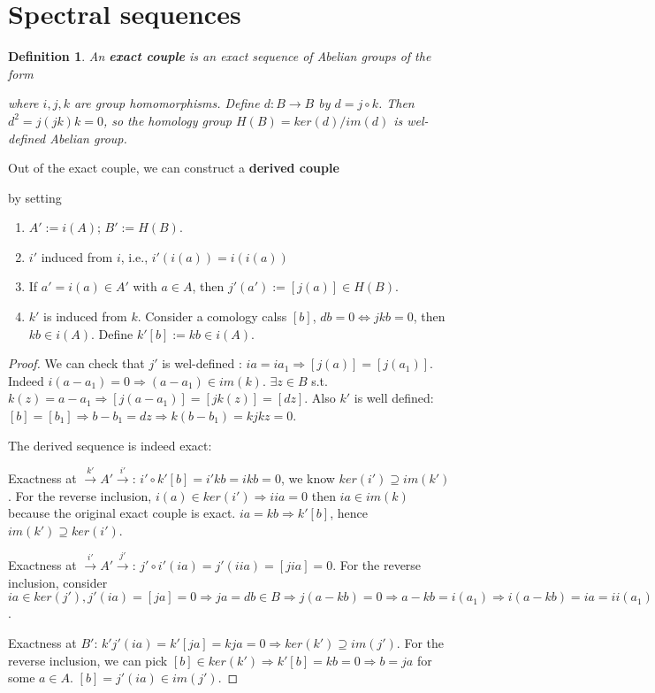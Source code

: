 \documentclass[11pt]{article}
\newtheorem{dfn}[thm]{Definition}
\newcommand{\Lrta}{\Longrightarrow}
\newcommand{\lrta}{\longrightarrow}
\newcommand{\Llrta}{\Longleftrightarrow}
\begin{document}
\section{Spectral sequences}
\begin{dfn}
An \textbf{exact couple} is an exact sequence of Abelian groups of the form
\begin{center}
\end{center}
where $i,j,k$ are group homomorphisms. Define $d:B\lrta B$ by $d=j\circ k$. Then $d^2=j(jk)k=0$, so the homology group $H(B)=ker(d)/im(d)$ is wel-defined Abelian group. 
\end{dfn}
Out of the exact couple, we can construct a \textbf{derived couple}
\begin{center}
\end{center}
by setting
\begin{enumerate}[label=(\roman*)]
\item $A':=i(A)$; $B':=H(B)$.
\item $i'$ induced from $i$, i.e., $i'(i(a))=i(i(a))$
\item If $a'=i(a)\in A'$ with $a\in A$, then $j'(a'):=[j(a)]\in H(B)$.
\item $k'$ is induced from $k$. Consider a comology calss $[b]$, $d b=0\Llrta jkb=0$, then $kb\in i(A)$. Define $k'[b]:=kb\in i(A)$.
\end{enumerate}
\begin{proof}
We can check that $j'$ is wel-defined : $ia=i a_1\Lrta [j(a)]=[j(a_1)]$. Indeed $i(a-a_1)=0\Lrta (a-a_1)\in im(k)$. $\exists z\in B$ s.t. $k(z)=a-a_1\Lrta [j(a-a_1)]=[jk(z)]=[dz]$. Also $k'$ is well defined: $[b]=[b_1]\Lrta b-b_1=d z\Lrta k(b-b_1)=k j kz=0$.

The derived sequence is indeed exact:

{Exactness at $\overset{k'}{\lrta}A'\overset{i'}{\lrta}$}: $i'\circ k'[b]=i'kb=ikb=0$, we know $ker(i')\supseteq im(k')$. For the reverse inclusion, $i(a)\in ker(i')\Lrta iia=0$ then $ia\in im(k)$ because the original exact couple is exact. $ia=kb\Lrta k'[b]$, hence $im(k')\supseteq ker(i')$.

Exactness at $\overset{i'}{\lrta}A'\overset{j'}{\lrta}$: $j'\circ i'(ia)=j'(iia)=[jia]=0$. For the reverse inclusion, consider $ia\in ker(j'), j'(ia)=[ja]=0\Lrta ja=db\in B\Lrta j(a-kb)=0\Lrta a-kb=i(a_1)\Lrta i(a-kb)=ia=ii(a_1)=i'(ia_1)$.

Exactness at $B'$: $k'j'(ia)=k'[ja]=kja=0\Lrta ker(k')\supseteq im(j')$. 
For the reverse inclusion, we can pick $[b]\in ker(k')\Lrta k'[b]=kb=0\Lrta b=ja$ for some $a\in A$. $[b]=j'(ia)\in im(j')$.

\end{proof}
\end{document}
